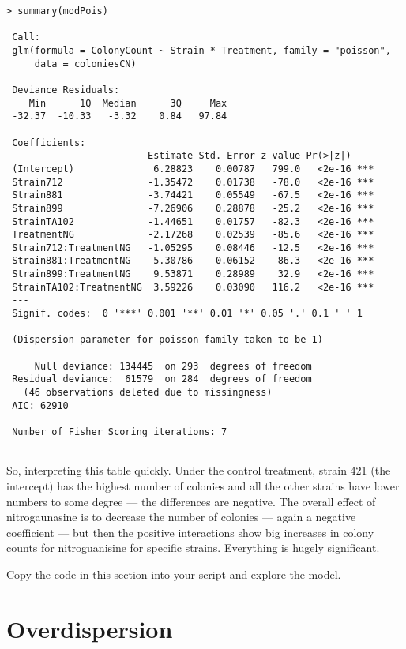 \begin{lstlisting}
> summary(modPois)
 
 Call:
 glm(formula = ColonyCount ~ Strain * Treatment, family = "poisson", 
     data = coloniesCN)
 
 Deviance Residuals: 
    Min      1Q  Median      3Q     Max  
 -32.37  -10.33   -3.32    0.84   97.84  
 
 Coefficients:
                         Estimate Std. Error z value Pr(>|z|)    
 (Intercept)              6.28823    0.00787   799.0   <2e-16 ***
 Strain712               -1.35472    0.01738   -78.0   <2e-16 ***
 Strain881               -3.74421    0.05549   -67.5   <2e-16 ***
 Strain899               -7.26906    0.28878   -25.2   <2e-16 ***
 StrainTA102             -1.44651    0.01757   -82.3   <2e-16 ***
 TreatmentNG             -2.17268    0.02539   -85.6   <2e-16 ***
 Strain712:TreatmentNG   -1.05295    0.08446   -12.5   <2e-16 ***
 Strain881:TreatmentNG    5.30786    0.06152    86.3   <2e-16 ***
 Strain899:TreatmentNG    9.53871    0.28989    32.9   <2e-16 ***
 StrainTA102:TreatmentNG  3.59226    0.03090   116.2   <2e-16 ***
 ---
 Signif. codes:  0 '***' 0.001 '**' 0.01 '*' 0.05 '.' 0.1 ' ' 1 
 
 (Dispersion parameter for poisson family taken to be 1)
 
     Null deviance: 134445  on 293  degrees of freedom
 Residual deviance:  61579  on 284  degrees of freedom
   (46 observations deleted due to missingness)
 AIC: 62910
 
 Number of Fisher Scoring iterations: 7
 
\end{lstlisting}

So, interpreting this table quickly. Under the control treatment, 
strain 421 (the intercept) has the highest number of colonies and all 
the other strains have lower numbers to some degree --- the differences 
are negative. The overall effect of nitrogaunasine is to decrease the 
number of colonies --- again a negative coefficient --- but then the 
positive interactions show big increases in colony counts for 
nitroguanisine for specific strains. Everything is hugely significant.

\begin{compactitem}[$\quad\star$]
	\item Copy the code in this section into your script and explore the 
	model.
\end{compactitem}

\section{Overdispersion}

